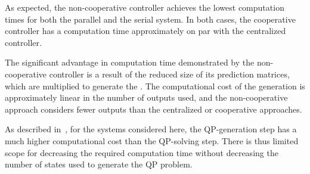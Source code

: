 As expected, the non-cooperative controller achieves the lowest computation times for both the parallel and the serial system.
In both cases, the cooperative controller has a computation time approximately on par with the centralized controller.

The significant advantage in computation time demonstrated by the non-cooperative controller is a result of the reduced size of its prediction matrices, which are multiplied to generate the .
The computational cost of the  generation is approximately linear in the number of outputs used, and the non-cooperative approach considers fewer outputs than the centralized or cooperative approaches.

As described in~\cite{Jones2016}, for the systems considered here, the QP-generation step has a much higher computational cost than the QP-solving step.
There is thus limited scope for decreasing the required computation time without decreasing the number of states used to generate the QP problem.
